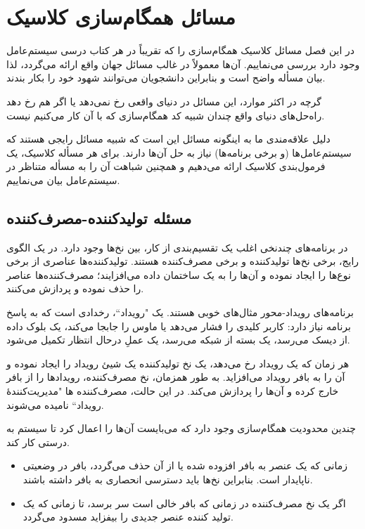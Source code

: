\documentclass{book}
\newcommand{\clearemptydoublepage}{\newpage\cleardoublepage}
\begin{document}
\clearemptydoublepage
\chapter{مسائل همگام‌سازی کلاسیک}

    در این فصل مسائل کلاسیک همگام‌سازی را که تقریباً در هر کتاب درسی سیستم‌عامل وجود دارد بررسی می‌نماییم. 
    آن‌ها معمولاً در غالب مسائل جهان واقع ارائه می‌گردد، لذا بیان مسأله واضح است و بنابراین دانشجویان می‌توانند شهود خود را بکار بندند. 
    
    گرچه در اکثر موارد، این مسائل در دنیای واقعی رخ نمی‌دهد یا اگر هم رخ دهد راه‌حل‌های دنیای واقع چندان شبیه کد همگام‌سازی 
    که با آن کار می‌کنیم نیست. 

    دلیل علاقه‌مندی ما به اینگونه مسائل این است که شبیه مسائل رایجی هستند که سیستم‌عامل‌ها  (و برخی برنامه‌ها) نیاز به حل آن‌ها دارند. 
    برای هر مسأله کلاسیک، یک فرمول‌بندی کلاسیک ارائه می‌دهیم و همچنین شباهت آن را به مسأله متناظر در سیستم‌عامل  بیان می‌نماییم. 

\section{مسئله تولیدکننده-مصرف‌کننده}

    در برنامه‌های چندنخی اغلب یک تقسیم‌بندی از کار، بین نخ‌ها وجود دارد. در یک الگوی رایج، برخی نخ‌ها تولیدکننده و برخی مصرف‌کننده هستند. 
    تولیدکننده‌ها عناصری از برخی نوع‌ها را ایجاد نموده و آن‌ها را به یک ساختمان داده می‌افزایند؛ مصرف‌کننده‌ها عناصر را حذف نموده و پردازش می‌کنند.

    برنامه‌های رویداد-محور مثال‌های خوبی هستند. یک "رویداد``، رخدادی است که به پاسخ برنامه نیاز دارد: 
    کاربر کلیدی را فشار می‌دهد یا ماوس را جابجا می‌کند، یک بلوک داده از دیسک می‌رسد، یک بسته از شبکه می‌رسد، یک عملِ در‌حال انتظار تکمیل می‌شود.

    هر زمان که یک رویداد رخ می‌دهد، یک نخ تولید‌کننده یک شیئ رویداد را ایجاد نموده و آن را به بافر رویداد می‌افزاید. 
    به طور همزمان، نخ مصرف‌کننده، رویدادها را از بافر خارج کرده و آن‌ها را پردازش می‌کند. 
    در این حالت، مصرف‌کننده ها "مدیریت‌کنندهٔ رویداد`` نامیده می‌شوند.

    چندین محدودیت همگام‌سازی وجود دارد که می‌بایست آن‌ها را اعمال کرد تا سیستم به درستی کار کند. 

\begin{itemize}

\item 
    زمانی که یک عنصر به بافر افزوده شده یا از آن حذف می‌گردد، بافر در وضعیتی ناپایدار است.
    بنابراین نخ‌ها باید دسترسی انحصاری به بافر داشته باشند.
    
\item 
    اگر یک نخ مصرف‌کننده در زمانی که بافر خالی است سر برسد، تا زمانی که یک تولید کننده عنصر جدیدی را بیفزاید مسدود می‌گردد.

\end{itemize}
\end{document}
